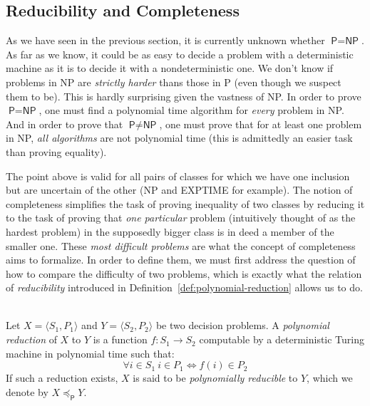 \subsection{Reducibility and Completeness}

As we have seen in the previous section, it is currently unknown whether \(\textsf{P} = \textsf{NP}\). As far as we know, it could be as easy to decide a problem with a deterministic machine as it is to decide it with a nondeterministic one. We don't know if problems in \textsf{NP} are \emph{strictly harder} thans those in \textsf{P} (even though we suspect them to be). This is hardly surprising given the vastness of \textsf{NP}. In order to prove \(\textsf{P} = \textsf{NP}\), one must find a polynomial time algorithm for \emph{every} problem in \textsf{NP}. And in order to prove that \(\textsf{P} \neq \textsf{NP}\), one must prove that for at least one problem in \textsf{NP}, \emph{all algorithms} are not polynomial time (this is admittedly an easier task than proving equality).

The point above is valid for all pairs of classes for which we have one inclusion but are uncertain of the other (\textsf{NP} and \textsf{EXPTIME} for example). The notion of completeness simplifies the task of proving inequality of two classes by reducing it to the task of proving that \emph{one particular} problem (intuitively thought of as the hardest problem) in the supposedly bigger class is in deed a member of the smaller one. These \emph{most difficult problems} are what the concept of completeness aims to formalize. In order to define them, we must first address the question of how to compare the difficulty of two problems, which is exactly what the relation of \emph{reducibility} introduced in Definition~\ref{def:polynomial-reduction} allows us to do.

\newcommand{\ple}{\preceq_\textsf{P}}
\begin{definition}\ \\
    \label{def:polynomial-reduction}
    Let \(X = \langle S_1, P_1\rangle\) and \(Y =\langle S_2, P_2\rangle\) be two decision problems. A \emph{polynomial reduction} of \(X\) to \(Y\) is a function \(f:S_1 \rightarrow S_2\) computable by a deterministic Turing machine in polynomial time such that:
    \[\forall i \in S_1\ i \in P_1 \iff f(i) \in P_2\]
    If such a reduction exists, \(X\) is said to be \emph{polynomially reducible} to \(Y\), which we denote by \(X \ple Y\).
\end{definition}

